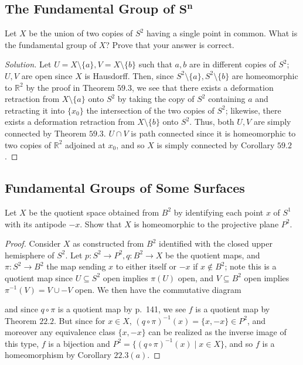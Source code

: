 \documentclass[12pt]{article}
\theoremstyle{remark}
\begin{document}
\subsection{The Fundamental Group of \texorpdfstring{$\bm{S^n}$}{S\textasciicircum n}}
\begin{problem}
  Let $X$ be the union of two copies of $S^2$ having a single point in common. What is the fundamental group of $X$? Prove that your answer is correct.
\end{problem}
\begin{proof}[Solution]
  Let $U = X \setminus \{a\}, V = X \setminus \{b\}$ such that $a,b$ are in different copies of $S^2$; $U,V$ are open since $X$ is Hausdorff. Then, since $S^2 \setminus \{a\}, S^2 \setminus \{b\}$ are homeomorphic to $\mathbb{R}^2$ by the proof in Theorem $59.3$, we see that there exists a deformation retraction from $X \setminus \{a\}$ onto $S^2$ by taking the copy of $S^2$ containing $a$ and retracting it into $\{x_0\}$ the intersection of the two copies of $S^2$; likewise, there exists a deformation retraction from $X \setminus \{b\}$ onto $S^2$. Thus, both $U,V$ are simply connected by Theorem $59.3$. $U \cap V$ is path connected since it is homeomorphic to two copies of $\mathbb{R}^2$ adjoined at $x_0$, and so $X$ is simply connected by Corollary $59.2$.
\end{proof}

\subsection{Fundamental Groups of Some Surfaces}
\setcounter{subsubsection}{1}
\begin{problem}
  Let $X$ be the quotient space obtained from $B^2$ by identifying each point $x$ of $S^1$ with its antipode $-x$. Show that $X$ is homeomorphic to the projective plane $P^2$.
\end{problem}
\begin{proof}
  Consider $X$ as constructed from $B^2$ identified with the closed upper
  hemisphere of $S^2$. Let $p\colon S^2 \to P^2, q\colon B^2 \to X$ be the
  quotient maps, and $\pi\colon S^2 \to B^2$ the map sending $x$ to either itself or $-x$ if $x \notin B^2$; note this is a quotient map since $U \subseteq S^2$ open implies $\pi(U)$ open, and $V \subseteq B^2$ open implies $\pi^{-1}(V) = V \cup -V$ open. We then have the commutative diagram
  \begin{center}
  \end{center}
  and since $q \circ \pi$ is a quotient map by p.~141, we see $f$ is a quotient map by Theorem $22.2$. But since for $x \in X$, $(q \circ \pi)^{-1}(x) = \{x,-x\} \in P^2$, and moreover any equivalence class $\{x,-x\}$ can be realized as the inverse image of this type, $f$ is a bijection and $P^2 = \{(q \circ \pi)^{-1}(x) \mid x \in X\}$, and so $f$ is a homeomorphism by Corollary $22.3(a)$.
\end{proof}
\end{document}
